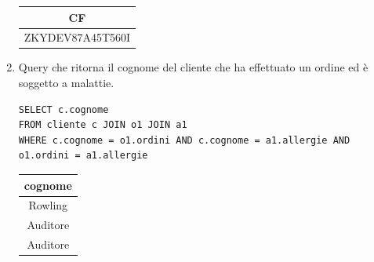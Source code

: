 \documentclass[10pt]{article}
\begin{document}
\begin{enumerate}[noitemsep]
\begin{center}
	\begin{table}[H]
		\centering
		\label{table:query2}
		\begin{tabular}{|c|}
			\hline
			\textbf{CF} \\ \hline
			ZKYDEV87A45T560I \\ \hline
		\end{tabular}
	\end{table}
\end{center}
	\item Query che ritorna il cognome del cliente che ha effettuato un ordine ed è soggetto a malattie.
	\begin{lstlisting}[style=Mysql]
SELECT c.cognome 
FROM cliente c JOIN o1 JOIN a1 
WHERE c.cognome = o1.ordini AND c.cognome = a1.allergie AND o1.ordini = a1.allergie
	\end{lstlisting}
	\begin{table}[H]
		\centering
		\label{table:query5}
		\begin{tabular}{|c|}
			\hline
			\textbf{cognome} \\ \hline
			Rowling          \\ \hline
			Auditore          \\	\hline
			Auditore          \\	\hline
		\end{tabular}
	\end{table}


\end{enumerate}
\end{document}
